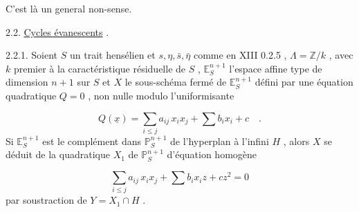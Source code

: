 \begin{center}
\end{center}
C'est là un general non-sense.

2.2.  \underline{Cycles évanescents} .

2.2.1.  Soient $S$ un trait hensélien et $s,\eta,\bar{s},\bar{\eta}$ comme en XIII 0.2.5 , $\Lambda = \mathbb{Z}/k$ , avec $k$ premier à la caractéristique résiduelle de $S$ , $\mathbb{E}^{n+1}_S$ l'espace affine type de dimension $n+1$ sur $S$ et $X$ le sous-schéma fermé de $\mathbb{E}^{n+1}_S$ défini par une équation quadratique $Q = 0$ , non nulle modulo l'uniformisante 



\begin{equation*}
 Q(\underline{x}) = \sum_{i \leq j} a_{ij}\, x_i x_j + \sum b_i x_i + c \quad .
\end{equation*}
Si $\mathbb{E}^{n+1}_S$ est le complément dans $\mathbb{P}^{n+1}_S$ de l'hyperplan à l'infini $H$ , alors $X$ se déduit de la quadratique $X_1$ de $\mathbb{P}^{n+1}_S$ d'équation homogène

\begin{equation}\tag{2.2.1.1}
\sum_{i \leqslant j} a_{ij}\, x_i x_j + \sum b_i x_i z + cz^2 = 0
\end{equation}
par soustraction de $Y = X_1 \cap H$ .

